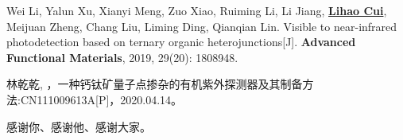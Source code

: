 \begin{enumerate}[{[1]}]
\item	Wei Li, Yalun Xu, Xianyi Meng, Zuo Xiao, Ruiming Li, Li Jiang, \textbf{\underline{Lihao Cui}}, Meijuan Zheng, Chang Liu, Liming Ding, Qianqian Lin. Visible to near-infrared photodetection based on ternary organic heterojunctions[J]. \textbf{Advanced Functional Materials}, 2019, 29(20): 1808948.

\item 林乾乾, {\bf{}}，一种钙钛矿量子点掺杂的有机紫外探测器及其制备方法:CN111009613A[P]，2020.04.14。

\end{enumerate}
\acknowledgement

{\songti{}感谢你、感谢他、感谢大家。}

  \iflib
  \else
  \newpage
  \cleardoublepage
  \fi







